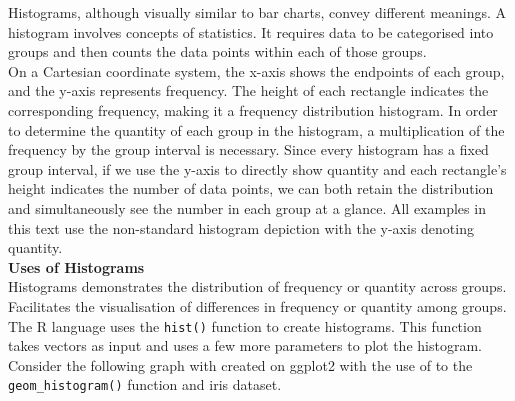 \documentclass{article}\usepackage[]{graphicx}\usepackage[]{xcolor}
\begin{document}
Histograms, although visually similar to bar charts, convey different meanings. A histogram involves concepts of statistics. It requires data to be categorised into groups and then counts the data points within each of those groups.\\

\noindent On a Cartesian coordinate system, the x-axis shows the endpoints of each group, and the y-axis represents frequency. The height of each rectangle indicates the corresponding frequency, making it a frequency distribution histogram. In order to determine the quantity of each group in the histogram, a multiplication of the frequency by the group interval is necessary. Since every histogram has a fixed group interval, if we use the y-axis to directly show quantity and each rectangle's height indicates the number of data points, we can both retain the distribution and simultaneously see the number in each group at a glance. All examples in this text use the non-standard histogram depiction with the y-axis denoting quantity.\\

\noindent
\textbf{Uses of Histograms}\\
\noindent Histograms demonstrates the distribution of frequency or quantity across groups. Facilitates the visualisation of differences in frequency or quantity among groups. The R language uses the \texttt{hist()} function to create histograms. This function takes vectors as input and uses a few more parameters to plot the histogram.\\

\noindent
Consider the following graph with created on ggplot2 with the use of to the \texttt{geom\_histogram()} function and iris dataset.
\end{document}
